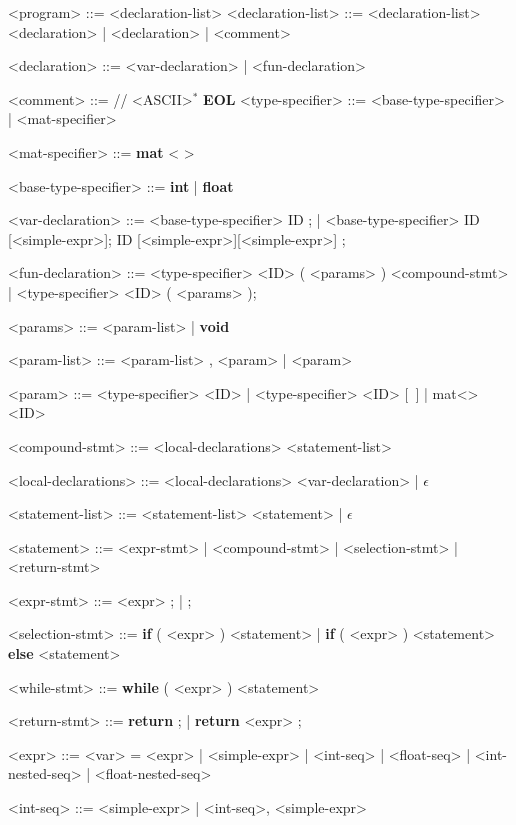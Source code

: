 \begin{grammar}
	<program> ::= <declaration-list> 
	<declaration-list> ::= <declaration-list> <declaration> | <declaration> | <comment>
	
	<declaration> ::= <var-declaration> | <fun-declaration>
	
	<comment> ::= // <ASCII>$^*$ \textbf{EOL}
	<type-specifier> ::= <base-type-specifier> | <mat-specifier>
	
	<mat-specifier> ::= \textbf{mat} \textless <base-type-specifier> \textgreater 

	<base-type-specifier> ::= \textbf{int} | \textbf{float}

	<var-declaration> ::= <base-type-specifier> ID ; | <base-type-specifier> ID [<simple-expr>];
	\alt <mat-specifier> ID [<simple-expr>][<simple-expr>] ;
	
	<fun-declaration> ::= <type-specifier> <ID> ( <params> ) <compound-stmt> | <type-specifier> <ID> ( <params> );
	
	<params> ::= <param-list> | \textbf{void}
	
	<param-list> ::= <param-list> , <param> | <param> 
	
	<param> ::= <type-specifier> <ID> | <type-specifier> <ID> $[$\ $]$ | mat\textless<type-specifier-base>> <ID> 
	
	<compound-stmt> ::= { <local-declarations> <statement-list> } 
	
	<local-declarations> ::= <local-declarations> <var-declaration> | $\epsilon$ 
	
	<statement-list> ::= <statement-list> <statement> | $\epsilon$
	
	<statement> ::= <expr-stmt> | <compound-stmt> | <selection-stmt> \alt <while-stmt> | <return-stmt> 
	
	<expr-stmt> ::= <expr> ; | ; 
	
	<selection-stmt> ::= \textbf{if} ( <expr> ) <statement> | \textbf{if} ( <expr> ) <statement> \textbf{else} <statement> 
	
	<while-stmt> ::= \textbf{while} ( <expr> ) <statement> 
	
	<return-stmt> ::= \textbf{return} ; | \textbf{return} <expr> ;
	
	<expr> ::= <var> = <expr> | <simple-expr> | {<int-seq>} | {<float-seq>} | {<int-nested-seq>} | {<float-nested-seq>}
	
	<int-seq> ::= <simple-expr> | <int-seq>, <simple-expr>
	

\end{grammar}
